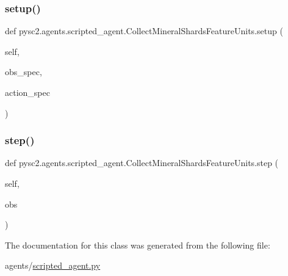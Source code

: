\subsubsection{\texorpdfstring{setup()}{setup()}}
{\footnotesize\ttfamily def pysc2.\+agents.\+scripted\+\_\+agent.\+Collect\+Mineral\+Shards\+Feature\+Units.\+setup (\begin{DoxyParamCaption}\item[{}]{self,  }\item[{}]{obs\+\_\+spec,  }\item[{}]{action\+\_\+spec }\end{DoxyParamCaption})}

\mbox{\label{classpysc2_1_1agents_1_1scripted__agent_1_1_collect_mineral_shards_feature_units_ac09e7d23c9cc9ad8b7a26c42561bd4b0}} 
\subsubsection{\texorpdfstring{step()}{step()}}
{\footnotesize\ttfamily def pysc2.\+agents.\+scripted\+\_\+agent.\+Collect\+Mineral\+Shards\+Feature\+Units.\+step (\begin{DoxyParamCaption}\item[{}]{self,  }\item[{}]{obs }\end{DoxyParamCaption})}



The documentation for this class was generated from the following file\+:\begin{DoxyCompactItemize}
\item 
agents/\mbox{\hyperlink{scripted__agent_8py}{scripted\+\_\+agent.\+py}}\end{DoxyCompactItemize}
